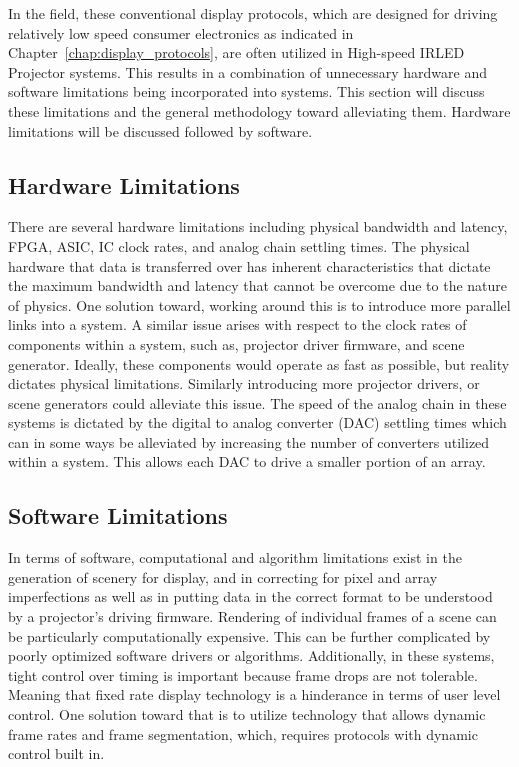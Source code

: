     In the field, these conventional display protocols, which are designed for driving relatively low speed consumer electronics as indicated in Chapter~\ref{chap:display_protocols}, are often utilized in High-speed IRLED Projector systems. This results in a combination of unnecessary hardware and software limitations being incorporated into systems. This section will discuss these limitations and the general methodology toward alleviating them. Hardware limitations will be discussed followed by software.

    \subsection{Hardware Limitations}
        There are several hardware limitations including physical bandwidth and latency, FPGA, ASIC, IC clock rates, and analog chain settling times. The physical hardware that data is transferred over has inherent characteristics that dictate the maximum bandwidth and latency that cannot be overcome due to the nature of physics. One solution toward, working around this is to introduce more parallel links into a system. A similar issue arises with respect to the clock rates of components within a system, such as, projector driver firmware, and scene generator. Ideally, these components would operate as fast as possible, but reality dictates physical limitations. Similarly introducing more projector drivers, or scene generators could alleviate this issue. The speed of the analog chain in these systems is dictated by the digital to analog converter (DAC) settling times which can in some ways be alleviated by increasing the number of converters utilized within a system. This allows each DAC to drive a smaller portion of an array.

    \subsection{Software Limitations}
        In terms of software, computational and algorithm limitations exist in the generation of scenery for display, and in correcting for pixel and array imperfections as well as in putting data in the correct format to be understood by a projector's driving firmware. Rendering of individual frames of a scene can be particularly computationally expensive. This can be further complicated by poorly optimized software drivers or algorithms. Additionally, in these systems, tight control over timing is important because frame drops are not tolerable. Meaning that fixed rate display technology is a hinderance in terms of user level control. One solution toward that is to utilize technology that allows dynamic frame rates and frame segmentation, which, requires protocols with dynamic control built in.


